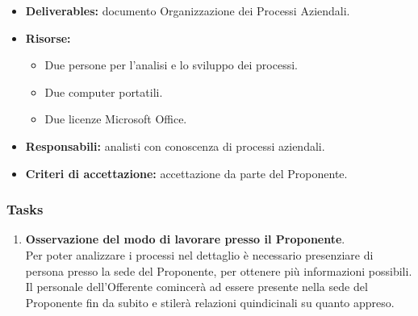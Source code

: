                 \begin{itemize}
               		\item  \textbf{Deliverables:} documento Organizzazione dei Processi Aziendali.
                    \item  \textbf{Risorse:} 
                    \begin{itemize}
                    	\item Due persone per l'analisi e lo sviluppo dei processi.
                        \item Due computer portatili.
                        \item Due licenze Microsoft Office.
                    \end{itemize}
                    \item  \textbf{Responsabili:} analisti con conoscenza di processi aziendali.
                    \item  \textbf{Criteri di accettazione:} accettazione da parte del Proponente.
                \end{itemize}

                \subsubsection*{Tasks}
					\begin{enumerate}
						\item \textbf{Osservazione del modo di lavorare presso il Proponente}.\\
                        Per poter analizzare i processi nel dettaglio è necessario presenziare di persona presso la sede del Proponente, per ottenere più informazioni possibili. Il personale dell'Offerente comincerà ad essere presente nella sede del Proponente fin da subito e stilerà relazioni quindicinali su quanto appreso.
					\end{enumerate}
                    
